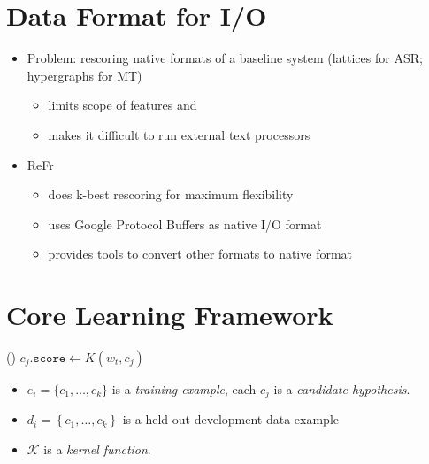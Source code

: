\documentclass[noback,portrait,twocolumn]{cuposter}
\begin{document}
\section{Data Format for I/O}
\begin{itemize}
\item Problem: rescoring native formats of a baseline system (lattices
  for ASR; hypergraphs for MT)
  \begin{itemize}
    \item limits scope of features and
    \item makes it difficult to run external text processors
  \end{itemize}
\item ReFr
  \begin{itemize}
  \item does k-best rescoring for maximum flexibility
  \item uses Google Protocol Buffers \cite{protobuf} as native I/O format
  \item provides tools to convert other formats to native format
  \end{itemize}
\end{itemize}

\nobreak
\section{Core Learning Framework}
\begin{minipage}[t]{23.5cm}{
\renewcommand\algorithmicforall{\textbf{foreach}}
\begin{algorithmic}
    \State {}
    \State {}
  \EndWhile
\EndProcedure
\State
{}
    \State {}
      \State {}()
    \EndIf
  \EndFor
\EndProcedure
\State
{}
    \State $c_j.\texttt{score} \leftarrow K(w_t, c_j)$
  \EndFor
\EndProcedure
\end{algorithmic}
}\end{minipage}
\begin{minipage}[t]{10cm}{
  \begin{itemize}
  \item $e_{i}=\{c_{1},\ldots,c_{k}\}$ is a \emph{training example},
        each $c_{j}$ is a \emph{candidate hypothesis}.
  \item $d_{i}=\left\{ c_{1},\ldots,c_{k}\right\} $ is a held-out development data        example
  \item $\mathcal{K}$ is a \emph{kernel function}.
  \end{itemize}
}\end{minipage}
\end{document}
